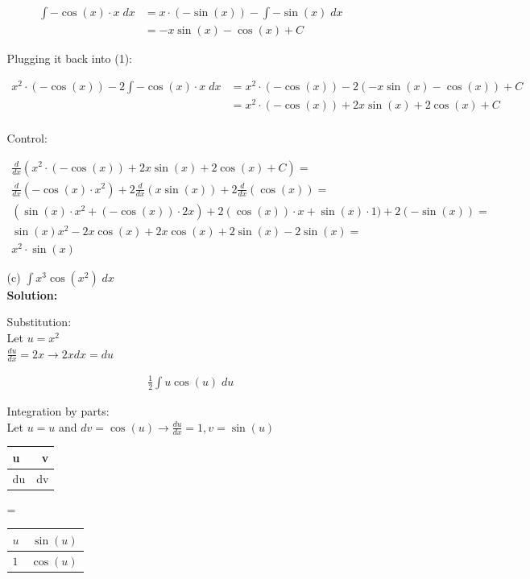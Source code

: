 \documentclass[a4paper]{article}
\begin{document}
\begin{enumerate}
\begin{enumerate}
\begin{center}
\end{center}
	
\begin{align*}
	\int -\cos(x) \cdot x \; dx &= x \cdot (-\sin(x)) - \int -\sin(x) \; dx\\
	&= - x\sin(x) - \cos(x) + C
\end{align*}	
	
	
Plugging it back into (1):

\begin{align*}
x^2 \cdot (-\cos(x)) - 2 \int -\cos(x) \cdot x \; dx &= x^2 \cdot (-\cos(x)) - 2 (- x\sin(x) - \cos(x)) + C\\
&= x^2 \cdot (-\cos(x)) + 2x\sin(x) + 2\cos(x) + C\\
\end{align*}


Control:

\begin{align*}
	\frac{d}{dx}(x^2 \cdot (-\cos(x)) + 2x\sin(x) + 2\cos(x) + C) = \\
	\frac{d}{dx}(-\cos(x) \cdot x^2) + 2 \frac{d}{dx}(x\sin(x)) + 2 \frac{d}{dx}(\cos(x)) =\\
	(\sin(x) \cdot x^2 + (-\cos(x)) \cdot 2x) + 2(\cos(x)) \cdot x + \sin(x) \cdot 1) + 2(-\sin(x)) = \\
	\sin(x)x^2 - 2x\cos(x) + 2x \cos(x) + 2\sin(x) - 2\sin(x) =\\
	x^2 \cdot \sin(x)
\end{align*}

	
	
	\item[(c)] $\int x^3 \cos(x^2) \; dx$\\
	\textbf{Solution:}
	
Substitution:\\

Let $u = x^2$\\
$\frac{du}{dx} = 2x \rightarrow 2xdx = du$	
	
\begin{align*}
	\frac{1}{2} \int u \cos(u) \; du
\end{align*}	
	
Integration by parts:\\

Let $u = u$ and $dv = \cos(u) \rightarrow \frac{du}{dx} = 1, v = \sin(u)$
	
\begin{center}
 \begin{tabular}{ l | r }
    \hline
    u & v \\ \hline 
    du & dv \\
    \hline
  \end{tabular}
  = 
 \begin{tabular}{ l | r }
    \hline
    $u$ & $\sin(u)$ \\ \hline 
    $1$ & $\cos(u)$ \\
    \hline
  \end{tabular}


\end{center}
\end{enumerate}
\end{enumerate}
\end{document}
